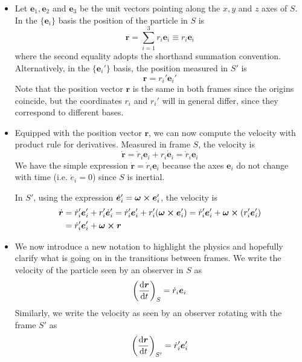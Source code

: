 \documentclass[11pt, a4paper]{article}
\newcommand{\e}{\bm{e}} %
\newcommand{\bdot}[1]{\dot{\bm{#1}}}
\begin{document}
\begin{itemize}
	\item Let $ \e_{1}, \e_{2} $ and $ \e_{3} $ be the unit vectors pointing along the $ x, y $ and $ z $ axes of $ S $. In the $ \{\e_{i}\} $ basis the position of the particle in $ S $ is 
	\begin{equation*}
		\bm{r} = \sum_{i=1}^{3}r_{i}\e_{i} \equiv r_{i}\e_{i}
	\end{equation*}
	where the second equality adopts the shorthand summation convention. Alternatively, in the $ \{\e_{i}' \} $ basis, the position measured in $ S' $ is
	\begin{equation*}
		\bm{r} = r_{i}'\e_{i}'
	\end{equation*}
	Note that the position vector $ \bm{r} $ is the same in both frames since the origins coincide, but the coordinates $ r_{i} $ and $ r_{i}' $ will in general differ, since they correspond to different bases.
	
	\item Equipped with the position vector $ \bm{r} $, we can now compute the velocity with product rule for derivatives. Measured in frame $ S $, the velocity is
	\begin{equation*}
		\bdot{r} = \dot{r}_{i}\e_{i} + r_{i}\dot{\e}_{i} =  \dot{r}_{i}\e_{i}
	\end{equation*}
	We have the simple expression $ \bdot{r} = \dot{r}_{i}\e_{i} $ because the axes $ \e_{i} $ do not change with time (i.e. $ \dot{e}_{i} = 0 $) since $ S $ is inertial. 
	
	In $ S' $, using the expression $ \dot{\e}_{i}' = \bm{\omega}\cross \e_{i}' $, the velocity is
	\begin{align*}
		\bdot{r} &= \dot{r}_{i}'\e_{i}' + r_{i}'\dot{\e}_{i}' =\dot{r}_{i}'\e_{i}' + r_{i}'(\bm{\omega} \cross \e_{i}') = \dot{r}_{i}'\e_{i}' + \bm{\omega} \cross (r_{i}' \e_{i}')\\
		&= \dot{r}_{i}'\e_{i}' + \bm{\omega} \cross \bm{r}
	\end{align*}

	
	\item We now introduce a new notation to highlight the physics and hopefully clarify what is going on in the transitions between frames. We write the velocity of the particle seen by an observer in $ S $ as
	\begin{equation*}
		\left(\dv{\bm{r}}{t}\right)_{S} = \dot{r}_{i}\e_{i}
	\end{equation*}
	Similarly, we write the velocity as seen by an observer rotating with the frame $ S' $ as
	\begin{equation*}
		\left(\dv{\bm{r}}{t}\right)_{S'} = \dot{r}_{i}'\e_{i}'
	\end{equation*}
	

\end{itemize}
\end{document}
